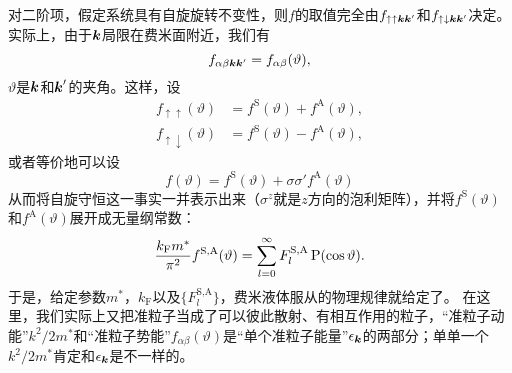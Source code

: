 对二阶项，假定系统具有自旋旋转不变性，则$f$的取值完全由$f_{\uparrow \uparrow \vb*{k} \vb*{k}'}$和$f_{\uparrow \downarrow \vb*{k} \vb*{k}'}$决定。
实际上，由于$\vb*{k}$局限在费米面附近，我们有
\[
    f_{\alpha \beta \vb*{k} \vb*{k}'} = f_{\alpha \beta}(\vartheta),
\]
$\vartheta$是$\vb*{k}$和$\vb*{k}'$的夹角。这样，设
\begin{equation}
    \begin{aligned}
        f_{\uparrow \uparrow}(\vartheta) &= f^\text{S}(\vartheta) + f^\text{A}(\vartheta), \\
        f_{\uparrow \downarrow}(\vartheta) &= f^\text{S}(\vartheta) - f^\text{A}(\vartheta),
    \end{aligned}
\end{equation}
或者等价地可以设
\begin{equation}
    {f}(\vartheta) = f^\text{S}(\vartheta) + {\sigma} {\sigma}' f^\text{A}(\vartheta)
\end{equation}
从而将自旋守恒这一事实一并表示出来（${\sigma}^z$就是$z$方向的泡利矩阵），并将$f^\text{S}(\vartheta)$和$f^\text{A}(\vartheta)$展开成无量纲常数：
\begin{equation}
    \frac{k_\text{F} m^*}{\pi^2} f^\text{S,A}(\vartheta) = \sum_{l=0}^\infty F_l^\text{S,A} \operatorname{P} (\cos \vartheta).
\end{equation}
于是，给定参数$m^*$，$k_\text{F}$以及$\{F_l^\text{S,A}\}$，费米液体服从的物理规律就给定了。
在这里，我们实际上又把准粒子当成了可以彼此散射、有相互作用的粒子，“准粒子动能”$k^2/2m^*$和“准粒子势能”$f_{\alpha \beta}(\vartheta)$是“单个准粒子能量”$\epsilon_{\vb*{k}}$的两部分；单单一个$k^2/2m^*$肯定和$\epsilon_{\vb*{k}}$是不一样的。

